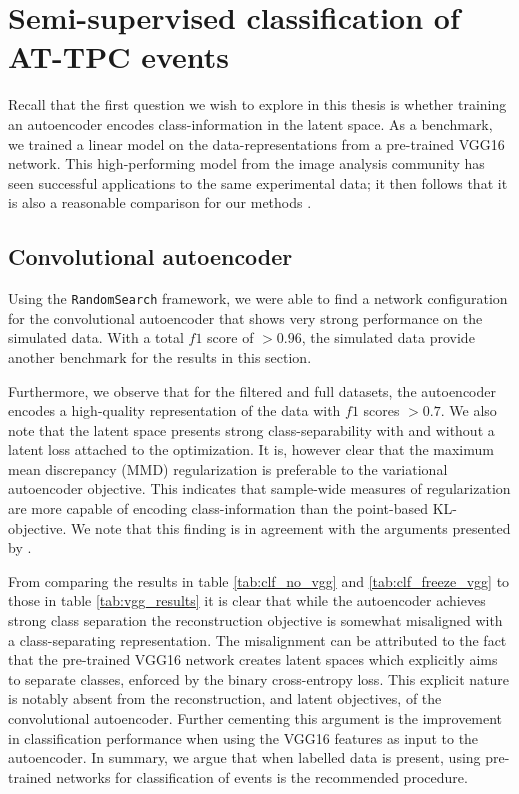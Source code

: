 \section{Semi-supervised classification of AT-TPC events}
Recall that the first question we wish to explore in this thesis is whether training an autoencoder encodes class-information in the latent space. As a benchmark, we trained a linear model on the data-representations from a pre-trained VGG16 network. This high-performing model from the image analysis community has seen successful applications to the same experimental data; it then follows that it is also a reasonable comparison for our methods \cite{Kuchera2019}. 

\subsection{Convolutional autoencoder}
Using the \lstinline{RandomSearch} framework, we were able to find a network configuration for the convolutional autoencoder that shows very strong performance on the simulated data. With a total $f1$ score of $>0.96$, the simulated data provide another benchmark for the results in this section.

 Furthermore, we observe that for the filtered and full datasets, the autoencoder encodes a high-quality representation of the data with $f1$ scores $>0.7$. We also note that the latent space presents strong class-separability with and without a latent loss attached to the optimization. It is, however clear that the maximum mean discrepancy (MMD) regularization is preferable to the variational autoencoder objective. This indicates that sample-wide measures of regularization are more capable of encoding class-information than the point-based KL-objective. We note that this finding is in agreement with the arguments presented by \citet{Zhao}. 

 From comparing the results in table \ref{tab:clf_no_vgg} and \ref{tab:clf_freeze_vgg} to those in table \ref{tab:vgg_results} it is clear that while the autoencoder achieves strong class separation the reconstruction objective is somewhat misaligned with a class-separating representation. The misalignment can be attributed to the fact that the pre-trained VGG16 network creates latent spaces which explicitly aims to separate classes, enforced by the binary cross-entropy loss. This explicit nature is notably absent from the reconstruction, and latent objectives, of the convolutional autoencoder. Further cementing this argument is the improvement in classification performance when using the VGG16 features as input to the autoencoder. In summary, we argue that when labelled data is present, using pre-trained networks for classification of events is the recommended procedure.

